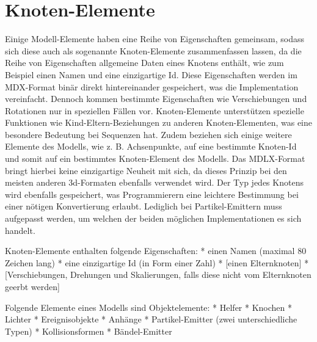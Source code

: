 \section{Knoten-Elemente}
Einige Modell-Elemente haben eine Reihe von Eigenschaften gemeinsam, sodass sich diese auch als sogenannte Knoten-Elemente zusammenfassen lassen, da die Reihe von Eigenschaften allgemeine Daten eines Knotens enthält, wie zum Beispiel einen Namen und eine einzigartige Id. Diese Eigenschaften werden im MDX-Format binär direkt hintereinander gespeichert, was die Implementation vereinfacht.
Dennoch kommen bestimmte Eigenschaften wie Verschiebungen und Rotationen nur in speziellen Fällen vor.
Knoten-Elemente unterstützen spezielle Funktionen wie Kind-Eltern-Beziehungen zu anderen Knoten-Elementen, was eine besondere Bedeutung bei Sequenzen hat.
Zudem beziehen sich einige weitere Elemente des Modells, wie z. B. Achsenpunkte, auf eine bestimmte Knoten-Id und somit auf ein bestimmtes Knoten-Element des Modells.
Das MDLX-Format bringt hierbei keine einzigartige Neuheit mit sich, da dieses Prinzip bei den meisten
anderen 3d-Formaten ebenfalls verwendet wird.
Der Typ jedes Knotens wird ebenfalls gespeichert, was Programmierern eine leichtere Bestimmung bei einer
nötigen Konvertierung erlaubt.
Lediglich bei Partikel-Emittern muss aufgepasst werden, um welchen der beiden möglichen Implementationen
es sich handelt.

Knoten-Elemente enthalten folgende Eigenschaften:
* einen Namen (maximal 80 Zeichen lang)
* eine einzigartige Id (in Form einer Zahl)
* [einen Elternknoten]
* [Verschiebungen, Drehungen und Skalierungen, falls diese nicht vom Elternknoten geerbt werden]

Folgende Elemente eines Modells sind Objektelemente:
* Helfer
* Knochen
* Lichter
* Ereignisobjekte
* Anhänge
* Partikel-Emitter (zwei unterschiedliche Typen)
* Kollisionsformen
* Bändel-Emitter

